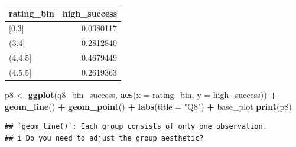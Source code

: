 \documentclass[
]{article}
\newenvironment{Shaded}{\begin{snugshade}}{\end{snugshade}}
\newcommand{\AttributeTok}[1]{\textcolor[rgb]{0.13,0.29,0.53}{#1}}
\newcommand{\ConstantTok}[1]{\textcolor[rgb]{0.56,0.35,0.01}{#1}}
\newcommand{\DecValTok}[1]{\textcolor[rgb]{0.00,0.00,0.81}{#1}}
\newcommand{\FloatTok}[1]{\textcolor[rgb]{0.00,0.00,0.81}{#1}}
\newcommand{\FunctionTok}[1]{\textcolor[rgb]{0.13,0.29,0.53}{\textbf{#1}}}
\newcommand{\NormalTok}[1]{#1}
\newcommand{\OtherTok}[1]{\textcolor[rgb]{0.56,0.35,0.01}{#1}}
\newcommand{\SpecialCharTok}[1]{\textcolor[rgb]{0.81,0.36,0.00}{\textbf{#1}}}
\newcommand{\StringTok}[1]{\textcolor[rgb]{0.31,0.60,0.02}{#1}}
\newcounter{none} %
\begin{document}
\begin{Shaded}
\end{Shaded}

{\def\LTcaptype{none} %
\begin{longtable}[]{@{}lr@{}}
\toprule\noalign{}
rating\_bin & high\_success \\
\midrule\noalign{}
\endhead
\bottomrule\noalign{}
\endlastfoot
{[}0,3{]} & 0.0380117 \\
(3,4{]} & 0.2812840 \\
(4,4.5{]} & 0.4679449 \\
(4.5,5{]} & 0.2619363 \\
\end{longtable}
}

\begin{Shaded}
\begin{Highlighting}[]
\NormalTok{p8 }\OtherTok{\textless{}{-}} \FunctionTok{ggplot}\NormalTok{(q8\_bin\_success, }\FunctionTok{aes}\NormalTok{(}\AttributeTok{x =}\NormalTok{ rating\_bin, }\AttributeTok{y =}\NormalTok{ high\_success)) }\SpecialCharTok{+}
    \FunctionTok{geom\_line}\NormalTok{() }\SpecialCharTok{+} \FunctionTok{geom\_point}\NormalTok{() }\SpecialCharTok{+} \FunctionTok{labs}\NormalTok{(}\AttributeTok{title =} \StringTok{"Q8"}\NormalTok{) }\SpecialCharTok{+}\NormalTok{ base\_plot}
\FunctionTok{print}\NormalTok{(p8)}
\end{Highlighting}
\end{Shaded}

\begin{verbatim}
## `geom_line()`: Each group consists of only one observation.
## i Do you need to adjust the group aesthetic?
\end{verbatim}
\end{document}
